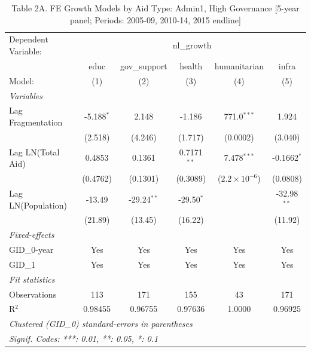 
\begin{table}[H]
   \caption{Table 2A. FE Growth Models by Aid Type: Admin1, High Governance [5-year panel; Periods: 2005-09, 2010-14, 2015 endline]}
   \centering
   \begin{tabular}{lccccc}
      \tabularnewline \midrule \midrule
      Dependent Variable: & \multicolumn{5}{c}{nl\_growth}\\
                         & educ         & gov\_support  & health        & humanitarian           & infra \\   
      Model:             & (1)          & (2)           & (3)           & (4)                    & (5)\\  
      \midrule
      \emph{Variables}\\
      Lag Fragmentation  & -5.188$^{*}$ & 2.148         & -1.186        & 771.0$^{***}$          & 1.924\\   
                         & (2.518)      & (4.246)       & (1.717)       & (0.0002)               & (3.040)\\   
      Lag LN(Total Aid)  & 0.4853       & 0.1361        & 0.7171$^{**}$ & 7.478$^{***}$          & -0.1662$^{*}$\\   
                         & (0.4762)     & (0.1301)      & (0.3089)      & ($2.2\times 10^{-6}$)  & (0.0808)\\   
      Lag LN(Population) & -13.49       & -29.24$^{**}$ & -29.50$^{*}$  &                        & -32.98$^{**}$\\   
                         & (21.89)      & (13.45)       & (16.22)       &                        & (11.92)\\   
      \midrule
      \emph{Fixed-effects}\\
      GID\_0-year        & Yes          & Yes           & Yes           & Yes                    & Yes\\  
      GID\_1             & Yes          & Yes           & Yes           & Yes                    & Yes\\  
      \midrule
      \emph{Fit statistics}\\
      Observations       & 113          & 171           & 155           & 43                     & 171\\  
      R$^2$              & 0.98455      & 0.96755       & 0.97636       & 1.0000                 & 0.96925\\  
      \midrule \midrule
      \multicolumn{6}{l}{\emph{Clustered (GID\_0) standard-errors in parentheses}}\\
      \multicolumn{6}{l}{\emph{Signif. Codes: ***: 0.01, **: 0.05, *: 0.1}}\\
   \end{tabular}
\end{table}



